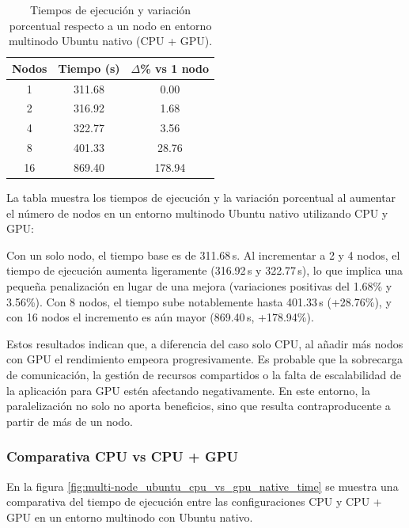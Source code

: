 \begin{table}[ht]
    \centering
    \begin{tabular}{|c|c|c|}
        \hline
        \textbf{Nodos} & \textbf{Tiempo (s)} & \textbf{$\Delta$\% vs 1 nodo} \\
        \hline
        1              & 311.68              & 0.00                          \\
        2              & 316.92              & 1.68                          \\
        4              & 322.77              & 3.56                          \\
        8              & 401.33              & 28.76                         \\
        16             & 869.40              & 178.94                        \\
        \hline
    \end{tabular}
    \caption{Tiempos de ejecución y variación porcentual respecto a un nodo en entorno multinodo Ubuntu nativo (CPU + GPU).}
    \label{tab:multi-node_ubuntu_gpu_native}
\end{table}

La tabla muestra los tiempos de ejecución y la variación porcentual al aumentar el número de nodos en un entorno multinodo Ubuntu nativo utilizando CPU y GPU:

Con un solo nodo, el tiempo base es de 311.68\,s. Al incrementar a 2 y 4 nodos, el tiempo de ejecución aumenta ligeramente (316.92\,s y 322.77\,s), lo que implica una pequeña penalización en lugar de una mejora (variaciones positivas del 1.68\% y 3.56\%). Con 8 nodos, el tiempo sube notablemente hasta 401.33\,s (+28.76\%), y con 16 nodos el incremento es aún mayor (869.40\,s, +178.94\%).

Estos resultados indican que, a diferencia del caso solo CPU, al añadir más nodos con GPU el rendimiento empeora progresivamente. Es probable que la sobrecarga de comunicación, la gestión de recursos compartidos o la falta de escalabilidad de la aplicación para GPU estén afectando negativamente. En este entorno, la paralelización no solo no aporta beneficios, sino que resulta contraproducente a partir de más de un nodo.

\subsubsection{Comparativa CPU vs CPU + GPU}

En la figura \ref{fig:multi-node_ubuntu_cpu_vs_gpu_native_time} se muestra una comparativa del tiempo de ejecución entre las configuraciones CPU y CPU + GPU en un entorno multinodo con Ubuntu nativo.

